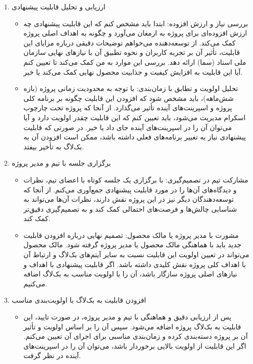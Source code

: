 \begin{enumerate}
\item ارزیابی و تحلیل قابلیت پیشنهادی

\begin{itemize}
    \item بررسی نیاز و ارزش افزوده: ابتدا باید مشخص کنم که این قابلیت پیشنهادی چه ارزش افزوده‌ای برای پروژه به ارمغان می‌آورد و چگونه به اهداف اصلی پروژه کمک می‌کند. از توسعه‌دهنده می‌خواهم توضیحات دقیقی درباره مزایای این قابلیت، تأثیر آن بر تجربه کاربران و نحوه تطبیق آن با نیازهای نهایی سازمان ملی اسناد (سما) ارائه دهد. بررسی این موارد به من کمک می‌کند تا تعیین کنم آیا این قابلیت به افزایش کیفیت و جذابیت محصول نهایی کمک می‌کند یا خیر.

    \item تحلیل اولویت و تطابق با زمان‌بندی: با توجه به محدودیت زمانی پروژه (بازه شش‌ماهه)، باید مشخص شود که افزودن این قابلیت چگونه بر برنامه کلی پروژه و اسپرینت‌های آینده تأثیر می‌گذارد. از آنجا که پروژه تحت چارچوب اسکرام مدیریت می‌شود، باید تعیین کنم که این قابلیت چقدر اولویت دارد و آیا می‌توان آن را در اسپرینت‌های آینده جای داد یا خیر. در صورتی که قابلیت پیشنهادی نیاز به تغییر برنامه‌های فعلی داشته باشد، ممکن است افزودن آن به بک‌لاگ به تأخیر بیفتد.
\end{itemize}

\item برگزاری جلسه با تیم و مدیر پروژه

\begin{itemize}
    \item مشارکت تیم در تصمیم‌گیری: با برگزاری یک جلسه کوتاه با اعضای تیم، نظرات و دیدگاه‌های آن‌ها را در مورد قابلیت پیشنهادی جمع‌آوری می‌کنم. از آنجا که توسعه‌دهندگان دیگر نیز در این پروژه نقش دارند، نظرات آن‌ها می‌تواند به شناسایی چالش‌ها و فرصت‌های احتمالی کمک کند و به تصمیم‌گیری دقیق‌تر کمک کند.

    \item مشورت با مدیر پروژه یا مالک محصول: تصمیم نهایی درباره افزودن قابلیت جدید باید با هماهنگی مالک محصول یا مدیر پروژه گرفته شود. مالک محصول می‌تواند در تعیین اولویت این قابلیت نسبت به سایر آیتم‌های بک‌لاگ و ارتباط آن با اهداف کلی پروژه نقش کلیدی داشته باشد. اگر قابلیت پیشنهادی با اهداف و نیازهای اصلی پروژه سازگار باشد، آن را با اولویت مناسب به بک‌لاگ اضافه می‌کنیم.
\end{itemize}


\item افزودن قابلیت به بک‌لاگ با اولویت‌بندی مناسب

\begin{itemize}
    \item پس از ارزیابی دقیق و هماهنگی با تیم و مدیر پروژه، در صورت تایید، این قابلیت به بک‌لاگ پروژه اضافه می‌شود. سپس آن را بر اساس اولویت و تأثیر آن بر پروژه دسته‌بندی کرده و زمان‌بندی مناسبی برای اجرای آن تعیین می‌کنم. اگر این قابلیت از اولویت بالایی برخوردار باشد، می‌توان آن را در اسپرینت‌های آینده در نظر گرفت.

\end{itemize}



\end{enumerate}

